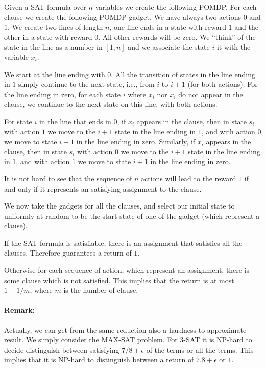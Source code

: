 Given a SAT formula over $n$ variables we create the following
POMDP. For each clause we create the following POMDP gadget. We have
always two actions $0$ and $1$. We create two lines of length $n$,
one line ends in a state with reward $1$ and the other in a state
with reward $0$. All other rewards will be zero. We ``think'' of the
state in the line as a number in $[1,n]$ and we associate the state
$i$ it with the variable $x_i$.

We start at the line ending with $0$. All the transition of states
in the line ending in $1$ simply continue to the next state, i.e.,
from $i$ to $i+1$ (for both actions). For the line ending in zero,
for each state $i$ where $x_i$ nor $\bar{x}_i$ do not appear in the
clause, we continue to the next state on this line, with both
actions.

For state $i$ in the line that ends in $0$, if $x_i$ appears
 in the clause, then in state $s_i$ with action $1$ we
move to the $i+1$ state in the line ending in $1$, and with action
$0$ we move to state $i+1$ in the line ending in zero.
%
Similarly, if $\bar{x}_i$ appears in the clause,  then in state
$s_i$ with action $0$ we move to the $i+1$ state in the line ending
in $1$, and with action $1$ we move to state $i+1$ in the line
ending in zero.

It is not hard to see that the sequence of $n$ actions will lead to
the reward $1$ if and only if it represents an satisfying assignment
to the clause.

We now take the gadgets for all the clauses, and select our initial
state to uniformly at random to be the start state of one of the
gadget (which represent a clause).

If the SAT formula is satisfiable, there is an assignment that
satisfies all the clauses. Therefore guarantees a return of $1$.

Otherwise for each sequence of action, which represent an
assignment, there is some clause which is not satisfied. This
implies that the return is at most $1-1/m$, where $m$ is the number
of clause.

\paragraph{Remark:} Actually, we can get from the same reduction
also a hardness to approximate result. We simply consider the
MAX-SAT problem. For 3-SAT it is NP-hard to decide distinguish
between satisfying $7/8+\epsilon$ of the terms or all the terms.
This implies that it is NP-hard to distinguish between a return of
$7.8+\epsilon$ or $1$.

